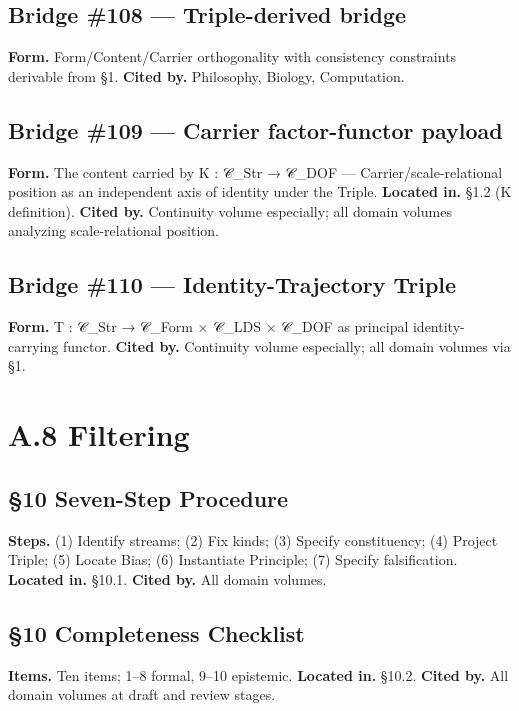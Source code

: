 \documentclass[11pt, openany]{book}
\newcommand{\sectionbreak}{\clearpage}
\begin{document}
\subsection{Bridge \#108 --- Triple-derived bridge}
\textbf{Form.} Form/Content/Carrier orthogonality with consistency constraints derivable from §1.
\textbf{Cited by.} Philosophy, Biology, Computation.

\subsection{Bridge \#109 --- Carrier factor-functor payload}
\textbf{Form.} The content carried by Κ : 𝒞\_\allowbreak{}Str → 𝒞\_\allowbreak{}DOF --- Carrier/scale-relational position as an independent axis of identity under the Triple.
\textbf{Located in.} §1.2 (Κ definition).
\textbf{Cited by.} Continuity volume especially; all domain volumes analyzing scale-relational position.

\subsection{Bridge \#110 --- Identity-Trajectory Triple}
\textbf{Form.} T : 𝒞\_\allowbreak{}Str → 𝒞\_\allowbreak{}Form × 𝒞\_\allowbreak{}LDS × 𝒞\_\allowbreak{}DOF as principal identity-carrying functor.
\textbf{Cited by.} Continuity volume especially; all domain volumes via §1.

\sectionbreak

\section{A.8 Filtering}

\subsection{§10 Seven-Step Procedure}
\textbf{Steps.} (1) Identify streams; (2) Fix kinds; (3) Specify constituency; (4) Project Triple; (5) Locate Bias; (6) Instantiate Principle; (7) Specify falsification.
\textbf{Located in.} §10.1.
\textbf{Cited by.} All domain volumes.

\subsection{§10 Completeness Checklist}
\textbf{Items.} Ten items; 1–8 formal, 9–10 epistemic.
\textbf{Located in.} §10.2.
\textbf{Cited by.} All domain volumes at draft and review stages.
\end{document}

